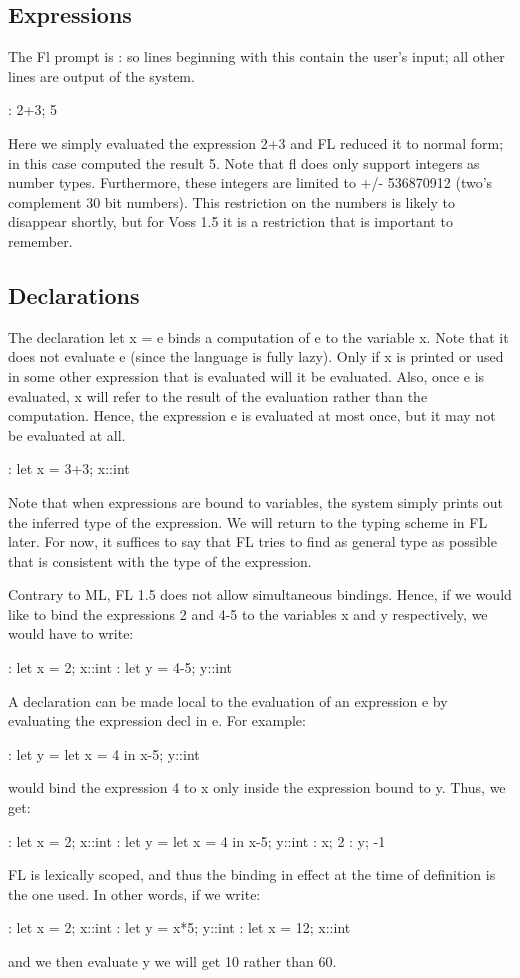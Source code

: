 \subsection{Expressions}
The Fl prompt is : so lines beginning with this contain
the user's input; all other lines are output of the system.
\begin{hol}
: 2+3;
5
\end{hol}
Here we simply evaluated the expression 2+3 and FL reduced
it to normal form; in this case computed the result 5. Note that
fl does only support integers as number types. Furthermore, these
integers are limited to +/- 536870912 (two's complement 30 bit
numbers). This restriction on the numbers is likely to disappear
shortly, but for Voss 1.5 it is a restriction that is important to
remember.

\subsection{Declarations}

The declaration let x = e binds a computation of e to
the variable x. Note that it does not evaluate e (since the language
is fully lazy). Only if x is printed or used in some other expression
that is evaluated will it be evaluated. Also, once e is evaluated,
x will refer to the result of the evaluation rather than the
computation. Hence, the expression e is evaluated at most once,
but it may not be evaluated at all.
\begin{hol}
: let x = 3+3;
x::int
\end{hol}
Note
that when expressions are bound to variables, the system simply
prints out the inferred type of the expression. We will return to
the typing scheme in FL later. For now, it suffices to say that FL
tries to find as general type as possible that is consistent with
the type of the expression.

Contrary to ML, FL 1.5 does not allow
simultaneous bindings. Hence, if we would like to bind the expressions
2 and 4-5 to the variables x and y respectively, we would have to
write:
\begin{hol}
: let x = 2;
x::int
: let y = 4-5;
y::int
\end{hol}
A declaration
can be made local to the evaluation of an expression e by evaluating
the expression decl in e. For example:
\begin{hol}
: let y = let x = 4 in x-5;
y::int
\end{hol}
would bind the expression 4 to x only inside the expression
bound to y. Thus, we get:
\begin{hol}
: let x = 2;
x::int
: let y = let x = 4 in x-5;
y::int
: x;
2
: y;
-1
\end{hol}
FL is lexically scoped, and thus
the binding in effect at the time of definition is the one used.
In other words, if we write:
\begin{hol}
: let x = 2;
x::int
: let y = x*5;
y::int
: let x = 12;
x::int
\end{hol}
and we then evaluate y we will get 10
rather than 60.

